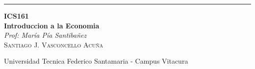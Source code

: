 
\begin{titlepage} %

	\raggedleft %

	\rule{1pt}{\textheight} %
	\hspace{0.05\textwidth} %
	\parbox[b]{0.75\textwidth}{ %

	{\Huge\bfseries ICS161 \\[0.5\baselineskip] Introduccion a la Economia}\\[2\baselineskip] %
	{\large\textit{Prof: María Pía Santibañez}}\\[4\baselineskip] %
	{\Large\textsc{Santiago J. Vasconcello Acuña}} %

	\vspace{0.5\textheight} %

	{\noindent Universidad Tecnica Federico Santamaria - Campus Vitacura}\\[\baselineskip] %
	}

\end{titlepage}


